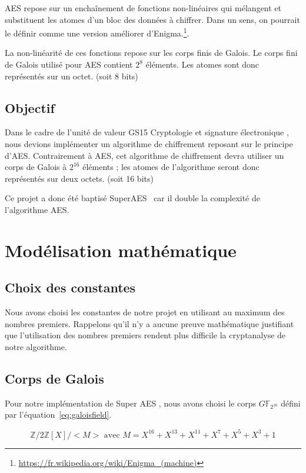\documentclass[12pt,a4paper]{report}
\begin{document}
AES repose sur un enchaînement de fonctions non-linéaires qui mélangent et substituent les
atomes d'un bloc des données à chiffrer. Dans un sens, on pourrait le définir comme une
version améliorer d'Enigma.\footnote{\url{https://fr.wikipedia.org/wiki/Enigma_(machine)}}.

La non-linéarité de ces fonctions repose sur les corps finis de Galois. Le
corps fini de Galois utilisé pour AES contient $2^{8}$ éléments. Les atomes
sont donc représentés sur un octet. (soit 8 bits)

\section{Objectif}

Dans le cadre de l'unité de valeur GS15 \og Cryptologie et signature
électronique \fg, nous devions implémenter un algorithme de chiffrement
reposant sur le principe d'AES. Contrairement à AES, cet algorithme de
chiffrement devra utiliser un corps de Galois à $2^{16}$ éléments ; les atomes
de l'algorithme seront donc représentés sur deux octets. (soit 16 bits)

Ce projet a donc été baptisé \og SuperAES \fg\ car il double la complexité de
l'algorithme AES.


\chapter{Modélisation mathématique}

\section{Choix des constantes}

Nous avons choisi les constantes de notre projet en utilisant au maximum des
nombres premiers. Rappelons qu'il n'y a aucune preuve mathématique justifiant
que l'utilisation des nombres premiers rendent plus difficile la cryptanalyse
de notre algorithme.

\section{Corps de Galois}

Pour notre implémentation de \og Super AES \fg, nous avons choisi le corps
$G\mathbb{F}_{2^{16}}$ défini par l'équation~\ref{eq:galoisfield}.

\begin{equation}
\label{eq:galoisfield}
\mathbb{Z}/2\mathbb{Z}[X]/<M> \mbox{ avec } M = X^{16} + X^{13} + X^{11} + X^{7} + X^{5} + X^{3} + 1
\end{equation}
\end{document}
